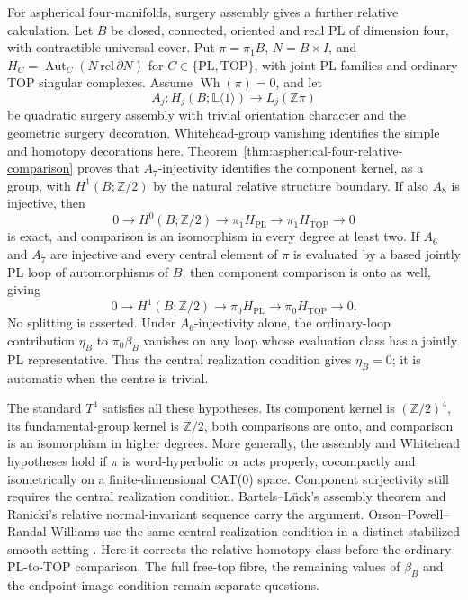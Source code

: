 \documentclass[11pt,a4paper]{article}
\theoremstyle{definition}
\begin{document}
For aspherical four-manifolds, surgery assembly gives a further
relative calculation. Let $B$ be closed, connected, oriented and real
PL of dimension four, with contractible universal cover. Put
$\pi=\pi_1B$, $N=B\times I$, and
$H_C=\operatorname{Aut}_C(N\,\mathrm{rel}\,\partial N)$ for
$C\in\{\mathrm{PL},\mathrm{TOP}\}$, with joint PL families and
ordinary TOP singular complexes. Assume $\operatorname{Wh}(\pi)=0$,
and let
\[
A_j:H_j(B;\mathbb L\langle1\rangle)\longrightarrow L_j(\mathbb Z\pi)
\]
be quadratic surgery assembly with trivial orientation character
and the geometric surgery decoration. Whitehead-group vanishing
identifies the simple and homotopy decorations here.
Theorem~\ref{thm:aspherical-four-relative-comparison} proves that
$A_7$-injectivity identifies the component kernel, as a group, with
$H^1(B;\mathbb Z/2)$ by the natural relative structure boundary.
If also $A_8$ is injective, then
\[
0\longrightarrow H^0(B;\mathbb Z/2)
\longrightarrow\pi_1H_{\mathrm{PL}}
\longrightarrow\pi_1H_{\mathrm{TOP}}\longrightarrow0
\]
is exact, and comparison is an isomorphism in every degree at least two.
If $A_6$ and $A_7$ are injective and every central element of $\pi$
is evaluated by a based jointly PL loop of automorphisms of $B$,
then component comparison is onto as well, giving
\[
0\longrightarrow H^1(B;\mathbb Z/2)
\longrightarrow\pi_0H_{\mathrm{PL}}
\longrightarrow\pi_0H_{\mathrm{TOP}}\longrightarrow0.
\]
No splitting is asserted. Under $A_6$-injectivity alone, the
ordinary-loop contribution $\eta_B$ to $\pi_0\beta_B$ vanishes
on any loop whose evaluation class has a jointly PL representative.
Thus the central realization condition gives $\eta_B=0$; it is
automatic when the centre is trivial.

The standard $T^4$ satisfies all these hypotheses. Its component
kernel is $(\mathbb Z/2)^4$, its fundamental-group kernel is
$\mathbb Z/2$, both comparisons are onto, and comparison is an
isomorphism in higher degrees. More generally, the assembly and
Whitehead hypotheses hold if $\pi$ is word-hyperbolic or acts
properly, cocompactly and isometrically on a finite-dimensional
CAT(0) space. Component surjectivity still requires the central
realization condition. Bartels--L\"uck's assembly theorem and
Ranicki's relative normal-invariant sequence carry the argument.
Orson--Powell--Randal-Williams use the same central realization
condition in a distinct stabilized smooth setting
\cite[Section~8.1, Remark~8.2 and Example~8.3, pp.~25--26;
Section~8.2, pp.~26--27]{OrsonPowellRandalWilliams2026}.
Here it corrects the relative homotopy class before the ordinary
PL-to-TOP comparison. The full free-top fibre, the remaining values
of $\beta_B$ and the endpoint-image condition remain separate questions.
\end{document}
